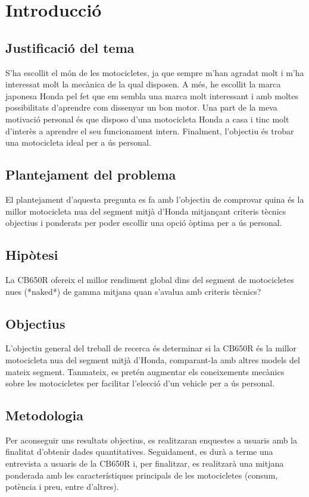 \section{Introducció}

\subsection{Justificació del tema}
S’ha escollit el món de les motocicletes, ja que sempre m’han agradat molt i m’ha interessat molt la mecànica de la qual disposen. A més, he escollit la marca japonesa Honda pel fet que em sembla una marca molt interessant i amb moltes possibilitats d’aprendre com dissenyar un bon motor. Una part de la meva motivació personal és que disposo d’una motocicleta Honda a casa i tinc molt d'interès a aprendre el seu funcionament intern. Finalment, l’objectiu és trobar una motocicleta ideal per a ús personal.

\subsection{Plantejament del problema}
El plantejament d’aquesta pregunta es fa amb l’objectiu de comprovar quina és la millor motocicleta nua del segment mitjà d’Honda mitjançant criteris tècnics objectius i ponderats per poder escollir una opció òptima per a ús personal.

\subsection{Hipòtesi}
La CB650R ofereix el millor rendiment global dins del segment de motocicletes nues (*naked*) de gamma mitjana quan s'avalua amb criteris tècnics?

\subsection{Objectius}
L’objectiu general del treball de recerca és determinar si la CB650R és la millor motocicleta nua del segment mitjà d’Honda, comparant-la amb altres models del mateix segment. Tanmateix, es pretén augmentar els coneixements mecànics sobre les motocicletes per facilitar l'elecció d'un vehicle per a ús personal.

\subsection{Metodologia}
Per aconseguir uns resultats objectius, es realitzaran enquestes a usuaris amb la finalitat d’obtenir dades quantitatives. Seguidament, es durà a terme una entrevista a usuaris de la CB650R i, per finalitzar, es realitzarà una mitjana ponderada amb les característiques principals de les motocicletes (consum, potència i preu, entre d’altres).

